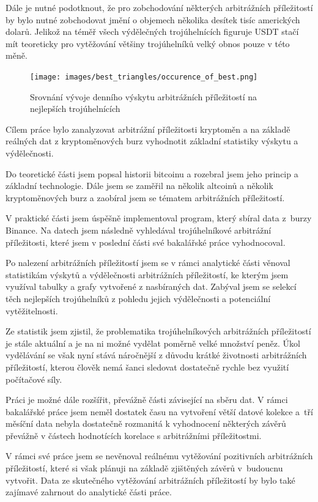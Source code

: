 \documentclass[thesis=B,czech]{FITthesis}[2019/03/21]
\begin{document}
Dále je nutné podotknout, že pro zobchodování některých arbitrážních příležitostí by bylo nutné zobchodovat jmění o objemech několika desítek tisíc amerických dolarů. Jelikož na téměř všech výdělečných trojúhelnících figuruje USDT stačí mít teoreticky pro vytěžování většiny trojúhelníků velký obnos pouze v této měně.

\begin{figure}\centering
	\texttt{[image: images/best\_triangles/occurence\_of\_best.png]}
	\caption{Srovnání vývoje denního výskytu arbitrážních příležitostí na nejlepších trojúhelnících }\label{occurence_of_best}
\end{figure}

\begin{conclusion}
Cílem práce bylo zanalyzovat arbitrážní příležitosti kryptoměn a na základě reálných dat z kryptoměnových burz vyhodnotit základní statistiky výskytu a výdělečnosti.

Do teoretické části jsem popsal historii bitcoinu a rozebral jsem jeho princip a základní technologie. Dále jsem se zaměřil na několik altcoinů a několik kryptoměnových burz a zaobíral jsem se tématem arbitrážních příležitostí. 

V praktické části jsem úspěšně implementoval program, který sbíral data z~burzy Binance. Na datech jsem následně vyhledával trojúhelníkové arbitrážní příležitosti, které jsem v poslední části své bakalářské práce vyhodnocoval. 

Po nalezení arbitrážních příležitostí jsem se v rámci analytické části věnoval statistikám výskytů a výdělečnosti arbitrážních příležitostí, ke kterým jsem využíval tabulky a grafy vytvořené z nasbíraných dat. Zabýval jsem se selekcí těch nejlepších trojúhelníků z pohledu jejich výdělečnosti a potenciální vytěžitelnosti.

Ze statistik jsem zjistil, že problematika trojúhelníkových arbitrážních příležitostí je stále aktuální a je na ni možné vydělat poměrně velké množství peněz. Úkol vydělávání se však nyní stává náročnější z důvodu krátké životnosti arbitrážních příležitostí, kterou člověk nemá šanci sledovat dostatečně rychle bez využití počítačové síly.

Práci je možné dále rozšířit, převážně části závisející na sběru dat. V rámci bakalářské práce jsem neměl dostatek času na vytvoření větší datové kolekce a~tří měsíční data nebyla dostatečně rozmanitá k vyhodnocení některých závěrů převážně v částech hodnotících korelace s arbitrážními příležitostmi.

V rámci své práce jsem se nevěnoval reálnému vytěžování pozitivních arbitrážních příležitostí, které si však plánuji na základě zjištěných závěrů v~budoucnu vytvořit. Data ze skutečného vytěžování arbitrážních příležitostí by bylo také zajímavé zahrnout do analytické části práce.

\end{conclusion}
\end{document}
